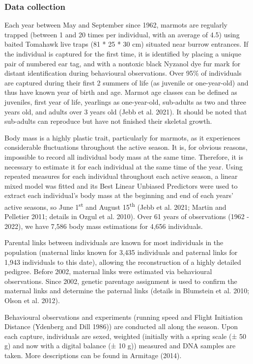 \documentclass[
  12pt,
  letterpaper,
]{scrartcl}
\begin{document}
\subsubsection{Data collection}\label{data-collection}

Each year between May and September since 1962, marmots are regularly
trapped (between 1 and 20 times per individual, with an average of 4.5)
using baited Tomahawk live traps (81 * 25 * 30 cm) situated near burrow
entrances. If the individual is captured for the first time, it is
identified by placing a unique pair of numbered ear tag, and with a
nontoxic black Nyzanol dye fur mark for distant identification during
behavioural observations. Over 95\% of individuals are captured during
their first 2 summers of life (as juvenile or one-year-old) and thus
have known year of birth and age. Marmot age classes can be defined as
juveniles, first year of life, yearlings as one-year-old, sub-adults as
two and three years old, and adults over 3 years old (Jebb et al. 2021).
It should be noted that sub-adults can reproduce but have not finished
their skeletal growth.

Body mass is a highly plastic trait, particularly for marmots, as it
experiences considerable fluctuations throughout the active season. It
is, for obvious reasons, impossible to record all individual body mass
at the same time. Therefore, it is necessary to estimate it for each
individual at the same time of the year. Using repeated measures for
each individual throughout each active season, a linear mixed model was
fitted and its Best Linear Unbiased Predictors were used to extract each
individual's body mass at the beginning and end of each years' active
seasons, so June 1\textsuperscript{st} and August 15\textsuperscript{th}
(Jebb et al. 2021; Martin and Pelletier 2011; details in Ozgul et al.
2010). Over 61 years of observations (1962 - 2022), we have 7,586 body
mass estimations for 4,656 individuals.

Parental links between individuals are known for most individuals in the
population (maternal links known for 3,435 individuals and paternal
links for 1,943 individuals to this date), allowing the reconstruction
of a highly detailed pedigree. Before 2002, maternal links were
estimated via behavioural observations. Since 2002, genetic parentage
assignment is used to confirm the maternal links and determine the
paternal links (details in Blumstein et al. 2010; Olson et al. 2012).

Behavioural observations and experiments (running speed and Flight
Initiation Distance (Ydenberg and Dill 1986)) are conducted all along
the season. Upon each capture, individuals are sexed, weighted
(initially with a spring scale (± 50 g) and now with a digital balance
(± 10 g)) measured and DNA samples are taken. More descriptions can be
found in Armitage (2014).
\end{document}
